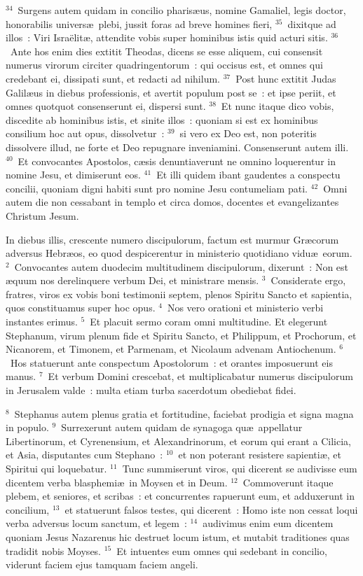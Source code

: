 ${}^{34}$~Surgens autem quidam in concilio pharis\ae us, nomine Gamaliel, legis doctor, honorabilis univers\ae\ plebi, jussit foras ad breve homines fieri,
${}^{35}$~dixitque ad illos~: Viri Isra\"elit\ae , attendite vobis super hominibus istis quid acturi sitis.
${}^{36}$~Ante hos enim dies extitit Theodas, dicens se esse aliquem, cui consensit numerus virorum circiter quadringentorum~: qui occisus est, et omnes qui credebant ei, dissipati sunt, et redacti ad nihilum.
${}^{37}$~Post hunc extitit Judas Galil\ae us in diebus professionis, et avertit populum post se~: et ipse periit, et omnes quotquot consenserunt ei, dispersi sunt.
${}^{38}$~Et nunc itaque dico vobis, discedite ab hominibus istis, et sinite illos~: quoniam si est ex hominibus consilium hoc aut opus, dissolvetur~:
${}^{39}$~si vero ex Deo est, non poteritis dissolvere illud, ne forte et Deo repugnare inveniamini. Consenserunt autem illi.
${}^{40}$~Et convocantes Apostolos, c\ae sis denuntiaverunt ne omnino loquerentur in nomine Jesu, et dimiserunt eos.
${}^{41}$~Et illi quidem ibant gaudentes a conspectu concilii, quoniam digni habiti sunt pro nomine Jesu contumeliam pati.
${}^{42}$~Omni autem die non cessabant in templo et circa domos, docentes et evangelizantes Christum Jesum.

\lettrine[lines=3,image=true,loversize=0.05,lraise=-0.03]{I}{}n diebus illis, crescente numero discipulorum, factum est murmur Gr\ae corum adversus Hebr\ae os, eo quod despicerentur in ministerio quotidiano vidu\ae\ eorum.
${}^{2}$~Convocantes autem duodecim multitudinem discipulorum, dixerunt~: Non est \ae quum nos derelinquere verbum Dei, et ministrare mensis.
${}^{3}$~Considerate ergo, fratres, viros ex vobis boni testimonii septem, plenos Spiritu Sancto et sapientia, quos constituamus super hoc opus.
${}^{4}$~Nos vero orationi et ministerio verbi instantes erimus.
${}^{5}$~Et placuit sermo coram omni multitudine. Et elegerunt Stephanum, virum plenum fide et Spiritu Sancto, et Philippum, et Prochorum, et Nicanorem, et Timonem, et Parmenam, et Nicolaum advenam Antiochenum.
${}^{6}$~Hos statuerunt ante conspectum Apostolorum~: et orantes imposuerunt eis manus.
${}^{7}$~Et verbum Domini crescebat, et multiplicabatur numerus discipulorum in Jerusalem valde~: multa etiam turba sacerdotum obediebat fidei.


${}^{8}$~Stephanus autem plenus gratia et fortitudine, faciebat prodigia et signa magna in populo.
${}^{9}$~Surrexerunt autem quidam de synagoga qu\ae\ appellatur Libertinorum, et Cyrenensium, et Alexandrinorum, et eorum qui erant a Cilicia, et Asia, disputantes cum Stephano~:
${}^{10}$~et non poterant resistere sapienti\ae , et Spiritui qui loquebatur.
${}^{11}$~Tunc summiserunt viros, qui dicerent se audivisse eum dicentem verba blasphemi\ae\ in Moysen et in Deum.
${}^{12}$~Commoverunt itaque plebem, et seniores, et scribas~: et concurrentes rapuerunt eum, et adduxerunt in concilium,
${}^{13}$~et statuerunt falsos testes, qui dicerent~: Homo iste non cessat loqui verba adversus locum sanctum, et legem~:
${}^{14}$~audivimus enim eum dicentem quoniam Jesus Nazarenus hic destruet locum istum, et mutabit traditiones quas tradidit nobis Moyses.
${}^{15}$~Et intuentes eum omnes qui sedebant in concilio, viderunt faciem ejus tamquam faciem angeli.

